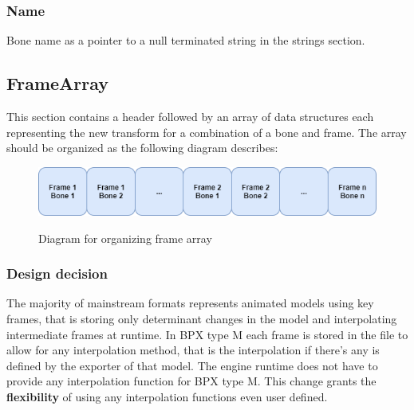 \subsubsection{Name}
Bone name as a pointer to a null terminated string in the strings section.

\subsection{FrameArray}
This section contains a header followed by an array of data structures each representing the new transform for a combination of a bone and frame.\newline
The array should be organized as the following diagram describes:
\begin{figure}[h!]
    \centering
    \includegraphics[scale=0.7]{Types/FrameArray_Diagram.png}
    \label{fig:FrameArray_Diagram}
    \caption{Diagram for organizing frame array}
\end{figure}

\subsubsection{Design decision}
The majority of mainstream formats represents animated models using key frames, that is storing only determinant changes in the model and interpolating intermediate frames at runtime. In BPX type M each frame is stored in the file to allow for any interpolation method, that is the interpolation if there's any is defined by the exporter of that model. The engine runtime does not have to provide any interpolation function for BPX type M.\newline
This change grants the \textbf{flexibility} of using any interpolation functions even user defined.

